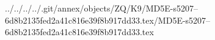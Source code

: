 ../../../../.git/annex/objects/ZQ/K9/MD5E-s5207--6d8b2135fed2a41c816e39f8b917dd33.tex/MD5E-s5207--6d8b2135fed2a41c816e39f8b917dd33.tex